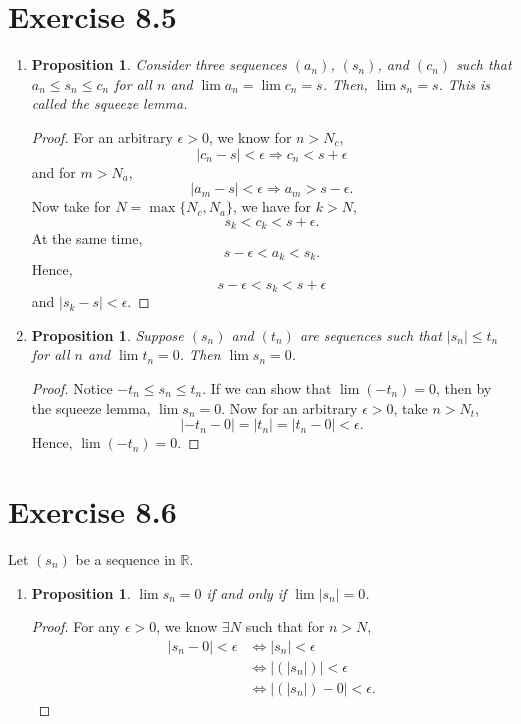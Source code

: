 \documentclass{article}
\newtheorem{proposition}[thm]{Proposition}
\begin{document}
\section*{Exercise 8.5}
\begin{enumerate}[label=(\alph*)]
    \item 
    \begin{proposition}
        Consider three sequences $(a_n)$, $(s_n)$, and $(c_n)$ such that $a_n \leq s_n \leq c_n$ 
        for all $n$ and $\lim a_n = \lim c_n = s$. Then, $\lim s_n = s$. This is called the 
        \textit{squeeze lemma}.
    \end{proposition}
    \begin{proof}
        For an arbitrary $\epsilon>0$, we know for $n > N_c$, $$|c_n-s|<\epsilon\Rightarrow 
        c_n<s+\epsilon$$ and for $m>N_a$, $$|a_m-s|<\epsilon\Rightarrow a_m>s-\epsilon.$$ 
        Now take for $N = \max\{N_c, N_a\}$, we have for $k>N$, $$s_k<c_k<s+
        \epsilon.$$ At the same time, $$s-\epsilon<a_k<s_k.$$ Hence, 
        $$s-\epsilon < s_k < s + \epsilon$$ and $|s_k-s| < \epsilon.$
    \end{proof}
    \item 
    \begin{proposition}
        Suppose $(s_n)$ and $(t_n)$ are sequences such that $|s_n| \leq t_n$ for all $n$ and 
        $\lim t_n = 0$. Then $\lim s_n = 0$.
    \end{proposition}
    \begin{proof}
        Notice $-t_n\le s_n\le t_n$. If we can show that $\lim (-t_n) = 0$, then by the squeeze 
        lemma, $\lim s_n = 0$. Now for an arbitrary $\epsilon>0$, take $n>N_t$, 
        $$|-t_n-0| = |t_n| = |t_n - 0|<\epsilon.$$ Hence, $\lim (-t_n) = 0$.
    \end{proof}
\end{enumerate}

\section*{Exercise 8.6}
Let $(s_n)$ be a sequence in $\mathbb{R}$.
\begin{enumerate}[label=(\alph*)]
    \item 
    \begin{proposition}
        $\lim s_n=0$ if and only if $\lim |s_n|=0$.
    \end{proposition}
    \begin{proof}
        For any $\epsilon>0$, we know $\exists N$ such that for $n>N$, 
        \begin{align*}
            |s_n-0| <\epsilon &\Leftrightarrow |s_n| < \epsilon \\
            &\Leftrightarrow |(|s_n|)| < \epsilon \\
            & \Leftrightarrow |(|s_n|)-0| < \epsilon.
        \end{align*}
    \end{proof}
\end{enumerate}
\end{document}
